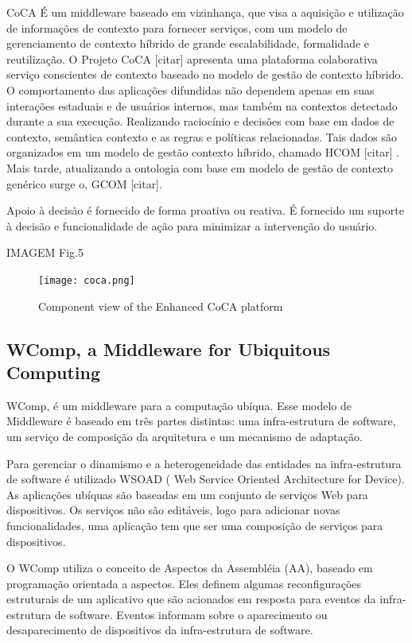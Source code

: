 \documentclass[12pt,a4paper,compsoc]{IEEEtran}
\begin{document}
CoCA É um middleware baseado em vizinhança, que visa a aquisição e utilização de informações de contexto para fornecer serviços, com um modelo de gerenciamento de contexto híbrido de grande escalabilidade, formalidade e reutilização.
O Projeto CoCA [citar] apresenta uma plataforma colaborativa serviço conscientes de contexto baseado no modelo de gestão de contexto híbrido. 
O comportamento das aplicações difundidas não dependem apenas em suas interações estaduais e de usuários internos, mas também na contextos detectado durante a sua execução. Realizando raciocínio e decisões com base em dados de contexto, semântica contexto e as regras e políticas relacionadas. Tais dados são organizados em um modelo de gestão contexto híbrido, chamado HCOM [citar] . Mais tarde, atualizando a ontologia com base em modelo de gestão de contexto genérico surge o, GCOM [citar].

Apoio à decisão é fornecido de forma proativa ou reativa. É fornecido um suporte à decisão e funcionalidade de ação para minimizar a intervenção do usuário.

IMAGEM Fig.5
\begin{figure}[t!]
\centerline{\texttt{[image: coca.png]}}
\caption{Component view of the Enhanced CoCA platform}
\label{coca}
\end{figure}


\subsection{WComp, a Middleware for Ubiquitous Computing}

WComp, é um middleware para a computação ubíqua. Esse modelo de Middleware é baseado em três partes distintas: uma infra-estrutura de software,  um serviço de composição da arquitetura e um mecanismo de adaptação.

Para gerenciar o dinamismo e a heterogeneidade das entidades na infra-estrutura de software é utilizado WSOAD ( Web Service Oriented Architecture for Device). As aplicações ubíquas são baseadas em um conjunto de serviços Web para dispositivos. Os serviços não são editáveis, logo para adicionar novas funcionalidades, uma aplicação tem que ser uma composição de serviços para dispositivos.

O WComp utiliza o conceito de Aspectos da Assembléia (AA), baseado em programação orientada a aspectos. Eles definem algumas reconfigurações estruturais de um aplicativo que são acionados em resposta para eventos da infra-estrutura de software. Eventos informam sobre o aparecimento ou desaparecimento de dispositivos da infra-estrutura de software. 
\end{document}
